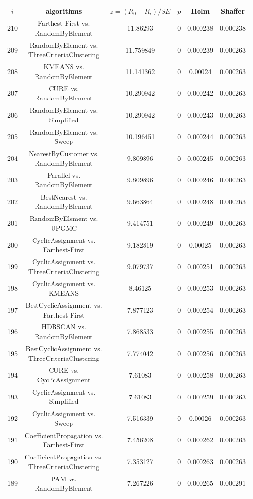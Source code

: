 \documentclass[a4paper,10pt]{article}
\begin{document}
\begin{landscape}
\begin{table}[!htp]
\centering\scriptsize
\begin{tabular}{cccccc}
$i$&algorithms&$z=(R_0 - R_i)/SE$&$p$&Holm&Shaffer\\
\hline210&Farthest-First vs. RandomByElement&11.86293&0&0.000238&0.000238\\
209&RandomByElement vs. ThreeCriteriaClustering&11.759849&0&0.000239&0.000263\\
208&KMEANS vs. RandomByElement&11.141362&0&0.00024&0.000263\\
207&CURE vs. RandomByElement&10.290942&0&0.000242&0.000263\\
206&RandomByElement vs. Simplified&10.290942&0&0.000243&0.000263\\
205&RandomByElement vs. Sweep&10.196451&0&0.000244&0.000263\\
204&NearestByCustomer vs. RandomByElement&9.809896&0&0.000245&0.000263\\
203&Parallel vs. RandomByElement&9.809896&0&0.000246&0.000263\\
202&BestNearest vs. RandomByElement&9.663864&0&0.000248&0.000263\\
201&RandomByElement vs. UPGMC&9.414751&0&0.000249&0.000263\\
200&CyclicAssignment vs. Farthest-First&9.182819&0&0.00025&0.000263\\
199&CyclicAssignment vs. ThreeCriteriaClustering&9.079737&0&0.000251&0.000263\\
198&CyclicAssignment vs. KMEANS&8.46125&0&0.000253&0.000263\\
197&BestCyclicAssignment vs. Farthest-First&7.877123&0&0.000254&0.000263\\
196&HDBSCAN vs. RandomByElement&7.868533&0&0.000255&0.000263\\
195&BestCyclicAssignment vs. ThreeCriteriaClustering&7.774042&0&0.000256&0.000263\\
194&CURE vs. CyclicAssignment&7.61083&0&0.000258&0.000263\\
193&CyclicAssignment vs. Simplified&7.61083&0&0.000259&0.000263\\
192&CyclicAssignment vs. Sweep&7.516339&0&0.00026&0.000263\\
191&CoefficientPropagation vs. Farthest-First&7.456208&0&0.000262&0.000263\\
190&CoefficientPropagation vs. ThreeCriteriaClustering&7.353127&0&0.000263&0.000263\\
189&PAM vs. RandomByElement&7.267226&0&0.000265&0.000291\\

\end{tabular}
\end{table}
\end{landscape}
\end{document}
